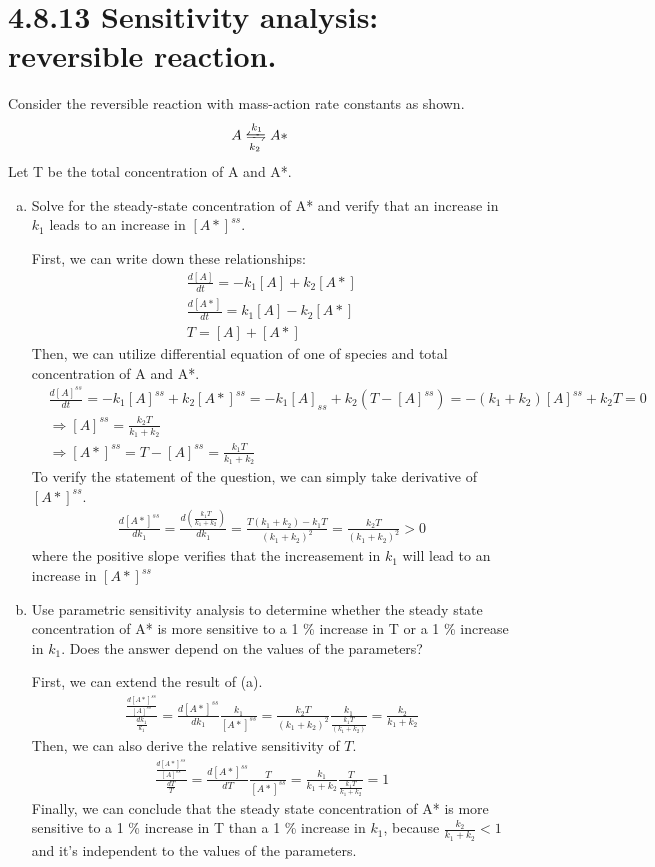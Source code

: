 \documentclass[paper=a4, fontsize=11pt]{scrartcl} %
\numberwithin{equation}{section} %
\numberwithin{figure}{section} %
\numberwithin{table}{section} %
\begin{document}
\section{4.8.13 Sensitivity analysis: reversible reaction. }
	Consider the reversible reaction with mass-action rate constants as shown. \\
	\begin{gather*}
		A \xleftrightharpoons[k_2]{k_1} A*
	\end{gather*}
	Let T be the total concentration of A and A*.
	\begin{enumerate}[a)]
		\item Solve for the steady-state concentration of A* and verify that an increase in $k_1$ leads to an increase in $[A*]^{ss}$.
		
		First, we can write down these relationships:
		\begin{gather*}
			\frac{d[A]}{dt}=-k_1[A]+k_2[A*]\\
			\frac{d[A*]}{dt}=k_1[A]-k_2[A*]\\
			T = [A] + [A*]
		\end{gather*}
		Then, we can utilize differential equation of one of species and total concentration of A and A*.
		\begin{align*}
			&\frac{d[A]^{ss}}{dt}=-k_1[A]^{ss}+k_2[A*]^{ss}=-k_1[A]_{ss}+k_2(T-[A]^{ss})=-(k_1+k_2)[A]^{ss}+k_2T=0\\
			&\Rightarrow [A]^{ss}=\frac{k_2T}{k_1+k_2}\\
			&\Rightarrow [A*]^{ss}=T-[A]^{ss}=\frac{k_1T}{k_1+k_2}
		\end{align*}
		To verify the statement of the question, we can simply take derivative of $[A*]^{ss}$.
		\begin{gather*}
			\frac{d[A*]^{ss}}{dk_1}=\frac{d(\frac{k_1T}{k_1+k_2})}{dk_1}=\frac{T(k_1+k_2)-k_1T}{(k_1+k_2)^2}=\frac{k_2T}{(k_1+k_2)^2}>0
		\end{gather*}	
		where the positive slope verifies that the increasement in $k_1$ will lead to an increase in $[A*]^{ss}$

		\item  Use parametric sensitivity analysis to determine whether the steady state concentration of A* is more sensitive to a 1 \% increase in T or a 1 \% increase in $k_1$. Does the answer depend on the values of the parameters?

		First, we can extend the result of (a).
		\begin{gather*}
			\frac{\frac{d[A*]^{ss}}{[A]^{ss}}}{\frac{dk_1}{k_1}}=\frac{d[A*]^{ss}}{dk_1}\frac{k_1}{[A*]^{ss}}=\frac{k_2T}{(k_1+k_2)^2}\frac{k_1}{\frac{k_1T}{(k_1+k_2)}}=\frac{k_2}{k_1+k_2}
		\end{gather*}
		Then, we can also derive the relative sensitivity of $T$.
		\begin{gather*}
			\frac{\frac{d[A*]^{ss}}{[A]^{ss}}}{\frac{dT}{T}}=\frac{d[A*]^{ss}}{dT}\frac{T}{[A*]^{ss}}=\frac{k_1}{k_1+k_2}\frac{T}{\frac{k_1T}{k_1+k_2}}=1
		\end{gather*}
		Finally, we can conclude that the steady state concentration of A*  is more sensitive to a 1 \% increase in T than a 1 \% increase in $k_1$, because $\frac{k_2}{k_1+k_2}<1$ and it's independent to the values of the parameters.
	\end{enumerate}
\end{document}
